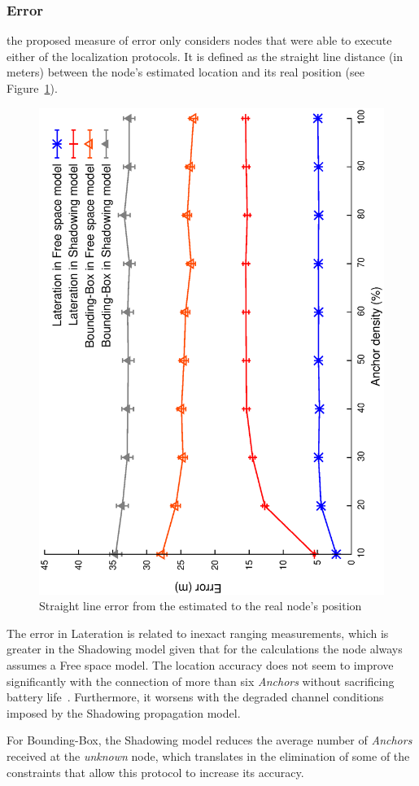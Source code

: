 \subsubsection{Error}
the proposed measure of error only considers nodes that were able to execute either of the localization protocols. It is defined as the straight line distance (in meters) between the node's estimated location and its real position (see Figure~\ref{fig:error}).

\begin{figure}[tb]
  \centering
  \includegraphics[width=0.7\linewidth, angle = -90]{section4/figures/error.eps}
  \caption{Straight line error from the estimated to the real node's position
  \label{fig:error}}
\end{figure}

The error in Lateration is related to inexact ranging measurements, which is greater in the Shadowing model given that for the calculations the node always assumes a Free space model. The location accuracy does not seem to improve significantly with the connection of more than six \emph{Anchors} without sacrificing battery life~\cite{beaconLimits}. Furthermore, it worsens with the degraded channel conditions imposed by the Shadowing propagation model.

For Bounding-Box, the Shadowing model reduces the average number of \emph{Anchors} received at the \emph{unknown} node, which translates in the elimination of some of the constraints that allow this protocol to increase its accuracy.

